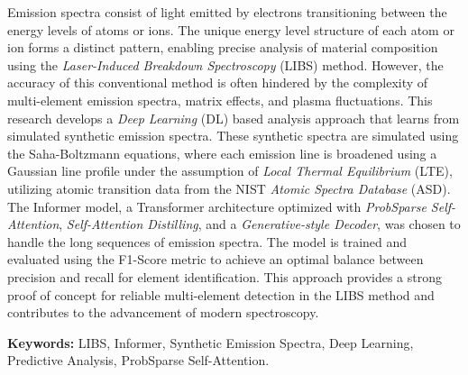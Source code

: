 \begin{abstracteng}

Emission spectra consist of light emitted by electrons transitioning between the energy levels of atoms or ions. The unique energy level structure of each atom or ion forms a distinct pattern, enabling precise analysis of material composition using the \textit{Laser-Induced Breakdown Spectroscopy} (LIBS) method. However, the accuracy of this conventional method is often hindered by the complexity of multi-element emission spectra, matrix effects, and plasma fluctuations. This research develops a \textit{Deep Learning} (DL) based analysis approach that learns from simulated synthetic emission spectra. These synthetic spectra are simulated using the Saha-Boltzmann equations, where each emission line is broadened using a Gaussian line profile under the assumption of \textit{Local Thermal Equilibrium} (LTE), utilizing atomic transition data from the NIST \textit{Atomic Spectra Database} (ASD). The Informer model, a Transformer architecture optimized with \textit{ProbSparse Self-Attention}, \textit{Self-Attention Distilling}, and a \textit{Generative-style Decoder}, was chosen to handle the long sequences of emission spectra. The model is trained and evaluated using the F1-Score metric to achieve an optimal balance between precision and recall for element identification. This approach provides a strong proof of concept for reliable multi-element detection in the LIBS method and contributes to the advancement of modern spectroscopy.

\bigskip
\noindent
\textbf{Keywords:} LIBS, Informer, Synthetic Emission Spectra, Deep Learning, Predictive Analysis, ProbSparse Self-Attention.
\end{abstracteng}
